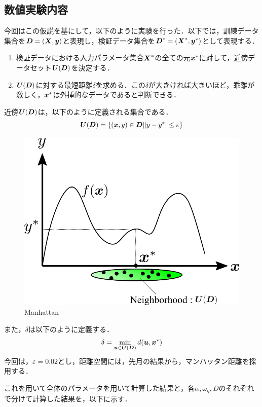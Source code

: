 \documentclass[16.7pt]{jsarticle}
\begin{document}
		\subsection{数値実験内容}
		今回はこの仮説を基にして，以下のように実験を行った．以下では，訓練データ集合を$ \boldsymbol{D} = (\boldsymbol{X},\boldsymbol{y}) $と表現し，検証データ集合を$ \boldsymbol{D}^* = (\boldsymbol{X}^*,\boldsymbol{y}^*) $として表現する．
		\begin{enumerate}
			\item 検証データにおける入力パラメータ集合$ \boldsymbol{X}^* $の全ての元$ \boldsymbol{x}^*$に対して，近傍データセット$ \boldsymbol{U}(\boldsymbol{D}) $を決定する．
			\item $ \boldsymbol{U}(\boldsymbol{D}) $に対する最短距離$ \delta $を求める．この$ \delta $が大きければ大きいほど，乖離が激しく，$ \boldsymbol{x}^* $は外挿的なデータであると判断できる．
		\end{enumerate}
		近傍$ \boldsymbol{U}(\boldsymbol{D}) $は，以下のように定義される集合である．
		\begin{equation}\label{eq:Neighborhood}
			\boldsymbol{U}(\boldsymbol{D}) = \{ (\boldsymbol{x},y) \in \boldsymbol{D}| |y-y^*| \leq \varepsilon \}
		\end{equation}
	
		\begin{figure}[h]
			\centering
			\includegraphics[width= 0.55\columnwidth]{./figure/Neighborhood.png}
			\caption{Manhattan}
		\end{figure}
		また，$ \delta $は以下のように定義する．
		\begin{equation}\label{eq:delta_eq}
			\delta = \min_{\boldsymbol{u} \in \boldsymbol{U}(\boldsymbol{D})} d(\boldsymbol{u},\boldsymbol{x}^*)
		\end{equation}
		今回は，$ \varepsilon = 0.02 $とし，距離空間には，先月の結果から，マンハッタン距離を採用する．
		
		これを用いて全体のパラメータを用いて計算した結果と，各$ \alpha,\omega_{\eta},D $のそれぞれで分けて計算した結果を，以下に示す．
		
\end{document}
